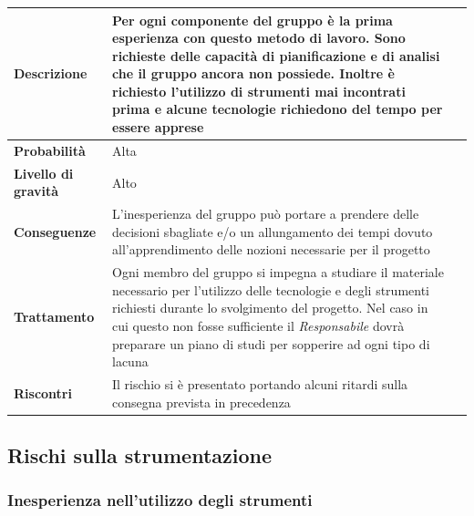 \begin{center}
	
	\begin{tabular}{|>{\centering}m{4cm} ||>{\centering}m{8cm} |>{\centering\arraybackslash}m{0pt}@{}|}
		\hline
		\textbf{Descrizione} & Per ogni componente del gruppo è la
		prima esperienza con questo metodo di lavoro. Sono richieste delle
		capacità di pianificazione e di analisi che il gruppo ancora non
		possiede. Inoltre è richiesto l'utilizzo di strumenti mai
		incontrati prima e alcune tecnologie richiedono del tempo per
		essere apprese & \\[2ex]
		\hline	
		\textbf{Probabilità} & Alta &\\[1ex]
		\hline
		\textbf{Livello di gravità} & Alto & \\[1ex]
		\hline
		\textbf{Conseguenze} & L'inesperienza del gruppo può portare a prendere delle decisioni sbagliate e/o un allungamento dei tempi dovuto all'apprendimento delle nozioni necessarie per il progetto & \\[1ex]
		\hline
		\textbf{Trattamento} & Ogni membro del gruppo si impegna a
		studiare il materiale necessario per l'utilizzo delle tecnologie e
		degli strumenti richiesti durante lo svolgimento del progetto. Nel
		caso in cui questo non fosse sufficiente il  \emph{Responsabile}  dovrà
		preparare un piano di studi per sopperire ad ogni tipo di lacuna & \\[1ex] 
		\hline
		\textbf{Riscontri} & Il rischio si è presentato portando alcuni ritardi sulla consegna prevista in precedenza & \\[1ex]
		\hline
	\end{tabular}
	
\end{center}

\subsection{Rischi sulla strumentazione}
\subsubsection{Inesperienza nell'utilizzo degli strumenti}

